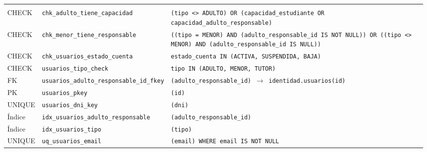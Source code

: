{\small
\begin{xltabular}{\textwidth}{@{}>{\raggedright\arraybackslash}p{1.7cm} >{\raggedright\arraybackslash}p{4.6cm} L@{}}
    \toprule
     &  &  \\
    \midrule
    \endfirsthead
    \toprule
     &  &  \\
    \midrule
    \endhead
    \bottomrule
    \endfoot
    CHECK & \texttt{chk\_\allowbreak{}adulto\_\allowbreak{}tiene\_\allowbreak{}capacidad} & \texttt{(\allowbreak{}tipo \textless{}\textgreater{} \textquotesingle{}ADULTO\textquotesingle{}) OR (\allowbreak{}capacidad\_\allowbreak{}estudiante OR capacidad\_\allowbreak{}adulto\_\allowbreak{}responsable)} \\
    CHECK & \texttt{chk\_\allowbreak{}menor\_\allowbreak{}tiene\_\allowbreak{}responsable} & \texttt{(\allowbreak{}(\allowbreak{}tipo = \textquotesingle{}MENOR\textquotesingle{}) AND (\allowbreak{}adulto\_\allowbreak{}responsable\_\allowbreak{}id IS NOT NULL)) OR (\allowbreak{}(\allowbreak{}tipo \textless{}\textgreater{} \textquotesingle{}MENOR\textquotesingle{}) AND (\allowbreak{}adulto\_\allowbreak{}responsable\_\allowbreak{}id IS NULL))} \\
    CHECK & \texttt{chk\_\allowbreak{}usuarios\_\allowbreak{}estado\_\allowbreak{}cuenta} & \texttt{estado\_\allowbreak{}cuenta IN (\allowbreak{}\textquotesingle{}ACTIVA\textquotesingle{},\allowbreak{} \textquotesingle{}SUSPENDIDA\textquotesingle{},\allowbreak{} \textquotesingle{}BAJA\textquotesingle{})} \\
    CHECK & \texttt{usuarios\_\allowbreak{}tipo\_\allowbreak{}check} & \texttt{tipo IN (\allowbreak{}\textquotesingle{}ADULTO\textquotesingle{},\allowbreak{} \textquotesingle{}MENOR\textquotesingle{},\allowbreak{} \textquotesingle{}TUTOR\textquotesingle{})} \\
    FK & \texttt{usuarios\_\allowbreak{}adulto\_\allowbreak{}responsable\_\allowbreak{}id\_\allowbreak{}fkey} & \texttt{(\allowbreak{}adulto\_\allowbreak{}responsable\_\allowbreak{}id) $\rightarrow$ identidad.usuarios(\allowbreak{}id)} \\
    PK & \texttt{usuarios\_\allowbreak{}pkey} & \texttt{(\allowbreak{}id)} \\
    UNIQUE & \texttt{usuarios\_\allowbreak{}dni\_\allowbreak{}key} & \texttt{(\allowbreak{}dni)} \\
    Índice & \texttt{idx\_\allowbreak{}usuarios\_\allowbreak{}adulto\_\allowbreak{}responsable} & \texttt{(\allowbreak{}adulto\_\allowbreak{}responsable\_\allowbreak{}id)} \\
    Índice & \texttt{idx\_\allowbreak{}usuarios\_\allowbreak{}tipo} & \texttt{(\allowbreak{}tipo)} \\
    UNIQUE & \texttt{uq\_\allowbreak{}usuarios\_\allowbreak{}email} & \texttt{(\allowbreak{}email) WHERE email IS NOT NULL} \\
\end{xltabular}
}

